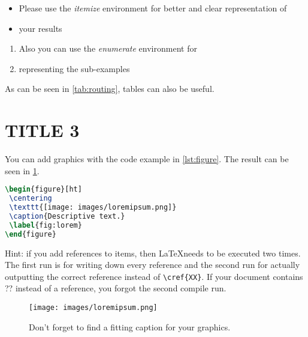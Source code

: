 \documentclass[parskip=full]{scrartcl}
\begin{document}
\begin{itemize}
\item Please use the \textit{itemize} environment for better and clear representation of
\item your results
\end{itemize}

\begin{enumerate}
\item Also you can use the \textit{enumerate} environment for 
\item representing the sub-examples
\end{enumerate}

As can be seen in \cref{tab:routing}, tables can also be useful.
\section{TITLE 3}

You can add graphics with the code example in \cref{lst:figure}. The result can be seen in \cref{fig:lorem}.

\begin{lstlisting}[language=tex, frame=single, caption={Code for adding a picture}, label=lst:figure, float, floatplacement=h]
\begin{figure}[ht]
 \centering
 \texttt{[image: images/loremipsum.png]}
 \caption{Descriptive text.} 
 \label{fig:lorem}
\end{figure} 
\end{lstlisting}

Hint: if you add references to items,
then \LaTeX needs to be executed two times. The first run is for writing down every reference and the second run for actually outputting the correct reference instead of \verb+\cref{XX}+.
If your document contains ?? instead of a reference, you forgot the second compile run.

\begin{figure}[ht]
 \centering %
 \texttt{[image: images/loremipsum.png]} %
 \caption{Don't forget to find a fitting caption for your graphics.} 
 \label{fig:lorem} %
\end{figure} 



\end{document}
